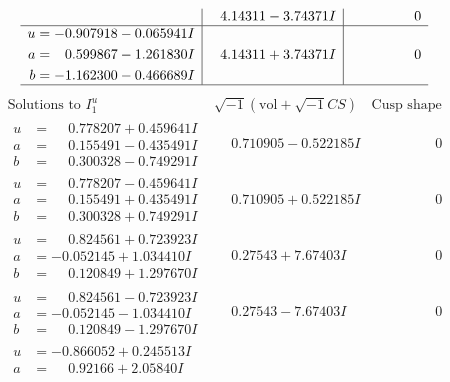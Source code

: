 \documentclass[1p]{elsarticle_modified}
\theoremstyle{definition}
\newcommand{\I}{\sqrt{-1}}
\begin{document}
$$\begin{array}{c|c|c}
 & \phantom{-}4.14311 - 3.74371 I & \phantom{-0.000000 } 0 \\ \hline\begin{aligned}
u &= -0.907918 - 0.065941 I \\
a &= \phantom{-}0.599867 - 1.261830 I \\
b &= -1.162300 - 0.466689 I\end{aligned}
 & \phantom{-}4.14311 + 3.74371 I & \phantom{-0.000000 } 0\\
 \hline 
 \end{array}$$\newpage$$\begin{array}{c|c|c}  
\text{Solutions to }I^u_{1}& \I (\text{vol} + \sqrt{-1}CS) & \text{Cusp shape}\\
 \hline 
\begin{aligned}
u &= \phantom{-}0.778207 + 0.459641 I \\
a &= \phantom{-}0.155491 - 0.435491 I \\
b &= \phantom{-}0.300328 - 0.749291 I\end{aligned}
 & \phantom{-}0.710905 - 0.522185 I & \phantom{-0.000000 } 0 \\ \hline\begin{aligned}
u &= \phantom{-}0.778207 - 0.459641 I \\
a &= \phantom{-}0.155491 + 0.435491 I \\
b &= \phantom{-}0.300328 + 0.749291 I\end{aligned}
 & \phantom{-}0.710905 + 0.522185 I & \phantom{-0.000000 } 0 \\ \hline\begin{aligned}
u &= \phantom{-}0.824561 + 0.723923 I \\
a &= -0.052145 + 1.034410 I \\
b &= \phantom{-}0.120849 + 1.297670 I\end{aligned}
 & \phantom{-}0.27543 + 7.67403 I & \phantom{-0.000000 } 0 \\ \hline\begin{aligned}
u &= \phantom{-}0.824561 - 0.723923 I \\
a &= -0.052145 - 1.034410 I \\
b &= \phantom{-}0.120849 - 1.297670 I\end{aligned}
 & \phantom{-}0.27543 - 7.67403 I & \phantom{-0.000000 } 0 \\ \hline\begin{aligned}
u &= -0.866052 + 0.245513 I \\
a &= \phantom{-}0.92166 + 2.05840 I \\

\end{aligned}
\end{array}$$
\end{document}
